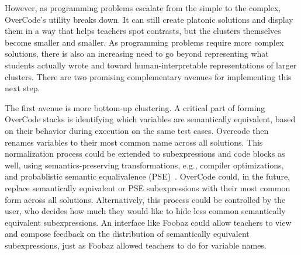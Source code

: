However, as programming problems escalate from the simple to the complex, OverCode's utility breaks down. It can still create platonic solutions and display them in a way that helps teachers spot contrasts, but the clusters themselves become smaller and smaller. As programming problems require more complex solutions, there is also an increasing need to go beyond representing what students actually wrote and toward human-interpretable representations of larger clusters. There are two promising complementary avenues for implementing this next step.

The first avenue is more bottom-up clustering. A critical part of forming OverCode stacks is identifying which variables are semantically equivalent, based on their behavior during execution on the same test cases. Overcode then renames variables to their most common name across all solutions. This normalization process could be extended to subexpressions and code blocks as well, using semantics-preserving transformations, e.g., compiler optimizations, and probablistic semantic equalivalence (PSE)~\cite{codewebs}. OverCode could, in the future, replace semantically equivalent or PSE subexpressions with their most common form across all solutions. Alternatively, this process could be controlled by the user, who decides how much they would like to hide less common semantically equivalent subexpressions. An interface like Foobaz could allow teachers to view and compose feedback on the distribution of semantically equivalent subexpressions, just as Foobaz allowed teachers to do for variable names.




